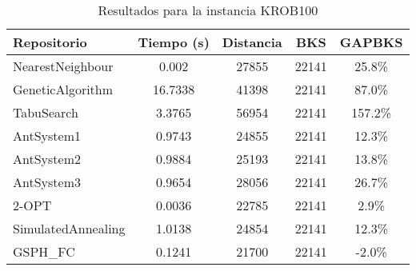 \begin{table}[H]
\centering
\caption{Resultados para la instancia KROB100}
\begin{tabular}{|l|c|c|c|c|}
\hline
\textbf{Repositorio} & \textbf{Tiempo (s)} & \textbf{Distancia} & \textbf{BKS} & \textbf{GAPBKS} \\ 
\hline
NearestNeighbour & 0.002 & 27855 & 22141 & 25.8\% \\ 
GeneticAlgorithm & 16.7338 & 41398 & 22141 & 87.0\% \\ 
TabuSearch & 3.3765 & 56954 & 22141 & 157.2\% \\ 
AntSystem1 & 0.9743 & 24855 & 22141 & 12.3\% \\ 
AntSystem2 & 0.9884 & 25193 & 22141 & 13.8\% \\ 
AntSystem3 & 0.9654 & 28056 & 22141 & 26.7\% \\ 
2-OPT & 0.0036 & 22785 & 22141 & 2.9\% \\ 
SimulatedAnnealing & 1.0138 & 24854 & 22141 & 12.3\% \\ 
GSPH_FC & 0.1241 & 21700 & 22141 & -2.0\% \\ 
\hline
\end{tabular}
\end{table}
